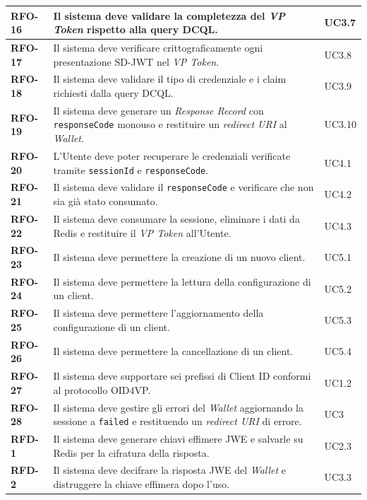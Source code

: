 \begin{longtable}{p{1.8cm} p{8.4cm} p{2.2cm}}
\hline
\textbf{RFO-16} & Il sistema deve validare la completezza del \textit{VP Token\glsadd{vptokeng}} rispetto alla query DCQL\glsadd{dcqlg}. & UC3.7 \\
\hline
\textbf{RFO-17} & Il sistema deve verificare crittograficamente ogni presentazione SD-JWT\glsadd{sdjwtg} nel \textit{VP Token\glsadd{vptokeng}}. & UC3.8 \\
\hline
\textbf{RFO-18} & Il sistema deve validare il tipo di credenziale e i claim richiesti dalla query DCQL\glsadd{dcqlg}. & UC3.9 \\
\textbf{RFO-19} & Il sistema deve generare un \textit{Response Record} con \texttt{responseCode} monouso e restituire un \textit{redirect URI} al \textit{Wallet}. & UC3.10 \\
\hline
\textbf{RFO-20} & L'Utente deve poter recuperare le credenziali verificate tramite \texttt{sessionId} e \texttt{responseCode}. & UC4.1 \\
\hline
\textbf{RFO-21} & Il sistema deve validare il \texttt{responseCode} e verificare che non sia già stato consumato. & UC4.2 \\
\hline
\textbf{RFO-22} & Il sistema deve consumare la sessione, eliminare i dati da Redis e restituire il \textit{VP Token\glsadd{vptokeng}} all'Utente. & UC4.3 \\
\hline
\textbf{RFO-23} & Il sistema deve permettere la creazione di un nuovo client. & UC5.1 \\
\hline
\textbf{RFO-24} & Il sistema deve permettere la lettura della configurazione di un client. & UC5.2 \\
\hline
\textbf{RFO-25} & Il sistema deve permettere l'aggiornamento della configurazione di un client. & UC5.3 \\
\hline
\textbf{RFO-26} & Il sistema deve permettere la cancellazione di un client. & UC5.4 \\
\hline
\textbf{RFO-27} & Il sistema deve supportare sei prefissi di Client ID conformi al protocollo OID4VP\glsadd{oid4vp}\glsadd{oid4vpg}. & UC1.2 \\
\hline
\textbf{RFO-28} & Il sistema deve gestire gli errori del \textit{Wallet} aggiornando la sessione a \texttt{failed} e restituendo un \textit{redirect URI} di errore. & UC3 \\
\hline
\textbf{RFD-1} & Il sistema deve generare chiavi effimere JWE\glsadd{jwe}\glsadd{jweg} e salvarle su Redis per la cifratura della risposta. & UC2.3 \\
\hline
\textbf{RFD-2} & Il sistema deve decifrare la risposta JWE\glsadd{jwe}\glsadd{jweg} del \textit{Wallet} e distruggere la chiave effimera dopo l'uso. & UC3.3 \\

\end{longtable}
